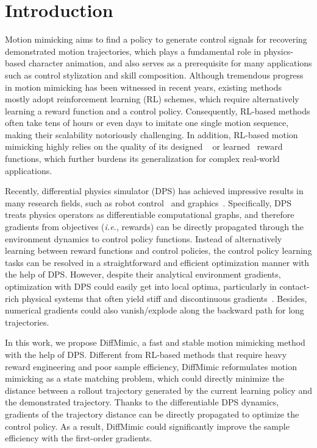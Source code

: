\section{Introduction}



Motion mimicking aims to find a policy to generate control signals for recovering demonstrated motion trajectories, which plays a fundamental role in physics-based character animation, and also serves as a prerequisite for many applications such as control stylization and skill composition. 
Although tremendous progress in motion mimicking has been witnessed in recent years, existing methods~\citep{peng2018deepmimic, peng2021amp} mostly adopt reinforcement learning (RL) schemes, which require alternatively learning a reward function and a control policy.
Consequently, RL-based methods often take tens of hours or even days to imitate one single motion sequence, making their scalability notoriously challenging.
In addition, RL-based motion mimicking highly relies on the quality of its designed ~\citep{peng2018deepmimic} or learned~\citep{peng2021amp} reward functions, which further burdens its generalization for complex real-world applications.




Recently, differential physics simulator (DPS) has achieved impressive results in many research fields, such as robot control~\citep{xu2022accelerated} and graphics~\citep{li2022diffcloth}.
Specifically, DPS treats physics operators as differentiable computational graphs, and therefore gradients from objectives (\textit{i.e.}, rewards) can be directly propagated through the environment dynamics to control policy functions.
Instead of alternatively learning between reward functions and control policies, the control policy learning tasks can be resolved in a straightforward and efficient optimization manner with the help of DPS. 
However, despite their analytical environment gradients, optimization with DPS could easily get into local optima, particularly in contact-rich physical systems that often yield stiff and discontinuous gradients~\citep{freeman2021brax, suh2022does, zhong2022differentiable}. 
Besides, numerical gradients could also vanish/explode along the backward path for long trajectories.






In this work, we propose DiffMimic, a fast and stable motion mimicking method with the help of DPS.
Different from RL-based methods that require heavy reward engineering and poor sample efficiency, DiffMimic reformulates motion mimicking as a state matching problem, which could directly minimize the distance between a rollout trajectory generated by the current learning policy and the demonstrated trajectory.
Thanks to the differentiable DPS dynamics, gradients of the trajectory distance can be directly propagated to optimize the control policy.
As a result, DiffMimic could significantly improve the sample efficiency with the first-order gradients.

